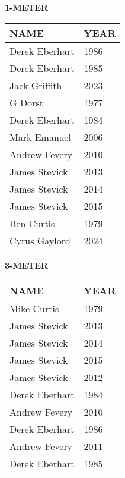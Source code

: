 \vspace{0.4cm}

\begin{center}
\begin{minipage}[t]{0.7\textwidth}
\centering
\textbf{1-METER}\\[0.05cm]
\begin{tabular}{@{}p{2.8cm}p{1.2cm}@{}}
\hline
\textbf{NAME} & \textbf{YEAR} \\
\hline
Derek Eberhart & 1986 \\
Derek Eberhart & 1985 \\
Jack Griffith & 2023 \\
G Dorst & 1977 \\
Derek Eberhart & 1984 \\
Mark Emanuel & 2006 \\
Andrew Fevery & 2010 \\
James Stevick & 2013 \\
James Stevick & 2014 \\
James Stevick & 2015 \\
Ben Curtis & 1979 \\
Cyrus Gaylord & 2024 \\
\hline
\end{tabular}
\end{minipage}
\end{center}

\vspace{0.4cm}

\begin{center}
\begin{minipage}[t]{0.7\textwidth}
\centering
\textbf{3-METER}\\[0.05cm]
\begin{tabular}{@{}p{2.8cm}p{1.2cm}@{}}
\hline
\textbf{NAME} & \textbf{YEAR} \\
\hline
Mike Curtis & 1979 \\
James Stevick & 2013 \\
James Stevick & 2014 \\
James Stevick & 2015 \\
James Stevick & 2012 \\
Derek Eberhart & 1984 \\
Andrew Fevery & 2010 \\
Derek Eberhart & 1986 \\
Andrew Fevery & 2011 \\
Derek Eberhart & 1985 \\
\hline
\end{tabular}
\end{minipage}
\end{center}

